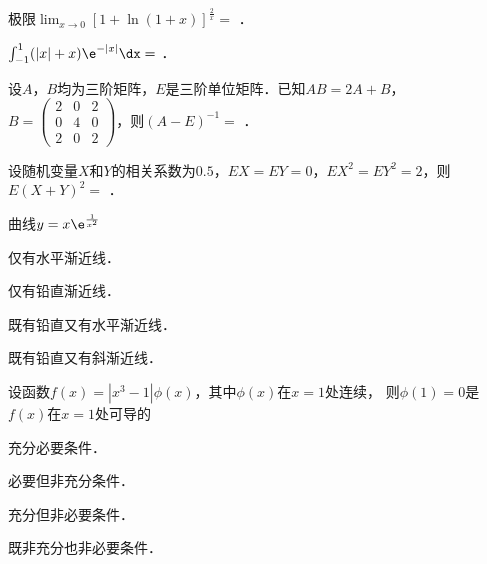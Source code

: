 \documentclass[plain,noanswer,medmath]{../../template/jnuexam}
\begin{document}






\begin{problem}
极限$\lim_{x \to 0} [1 + \ln(1 + x)]^{\frac{2}{x}} =$ \fillin{}．
\end{problem}


\begin{problem}
$\int_{-1}^1 (|x| + x) \e^{- |x|} \dx =$ \fillin{}．
\end{problem}




\begin{problem}
设$A$，$B$均为三阶矩阵，$E$是三阶单位矩阵．已知$AB = 2A + B$，$B = \begin{pmatrix}
  2 & 0 & 2 \\
  0 & 4 & 0 \\
  2 & 0 & 2
\end{pmatrix}$，则$(A - E)^{-1} =$ \fillin{}．
\end{problem}




\begin{problem}
设随机变量$X$和$Y$的相关系数为$0.5$，$EX = EY = 0$，$EX^2 = EY^2 = 2$，则$E(X + Y)^2 =$ \fillin{}．
\end{problem}




\begin{problem}
曲线$y = x\e^{\frac{1}{x^2}}$\pickout{}
\begin{abcd}
\item 仅有水平渐近线．
\item 仅有铅直渐近线．
\item 既有铅直又有水平渐近线．
\item 既有铅直又有斜渐近线．
\end{abcd}
\end{problem}


\begin{problem}
设函数$f(x) = \left| x^3 - 1 \right|\phi(x)$，其中$\phi (x)$在$x = 1$处连续，
则$\phi (1) = 0$是$f(x)$在$x = 1$处可导的\pickout{}
\begin{abcd}
\item 充分必要条件．
\item 必要但非充分条件．
\item 充分但非必要条件．
\item 既非充分也非必要条件．
\end{abcd}
\end{problem}
\end{document}
